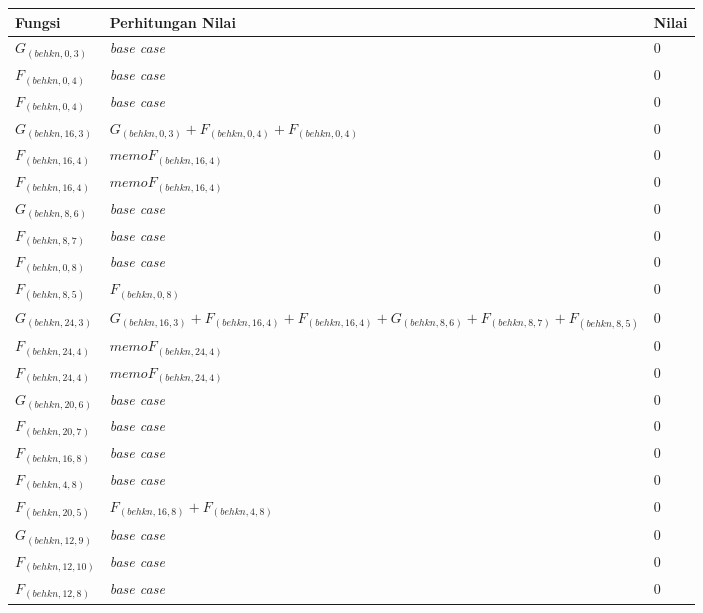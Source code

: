 \begin{appendices}
  \begin{table}[H]
  	\centering
  	\begin{tabular} {|p{3cm}|p{5cm}|p{1cm}|} \hline
  		Fungsi & Perhitungan Nilai & Nilai \\ \hline
  		$ G_{(behkn, 0, 3)} $ & \textit{base case} & $ 0 $ \\ \hline
  		$ F_{(behkn, 0, 4)} $ & \textit{base case} & $ 0 $ \\ \hline
  		$ F_{(behkn, 0, 4)} $ & \textit{base case} & $ 0 $ \\ \hline
  		$ G_{(behkn, 16, 3)}  $ & $G_{(behkn, 0, 3)} + F_{(behkn, 0, 4)} + F_{(behkn, 0, 4)}$ & $ 0 $ \\ \hline
  		$ F_{(behkn, 16, 4)}  $ & $memoF_{(behkn, 16, 4)}$ & $ 0 $ \\ \hline
  		$ F_{(behkn, 16, 4)}  $ & $memoF_{(behkn, 16, 4)}$ & $ 0 $ \\ \hline
  		$ G_{(behkn, 8, 6)} $ & \textit{base case} & $ 0 $ \\ \hline
  		$ F_{(behkn, 8, 7)} $ & \textit{base case} & $ 0 $ \\ \hline
  		$ F_{(behkn, 0, 8)} $ & \textit{base case} & $ 0 $ \\ \hline
  		$ F_{(behkn, 8, 5)}  $ & $F_{(behkn, 0, 8)}$ & $ 0 $ \\ \hline
  		$ G_{(behkn, 24, 3)}  $ & $G_{(behkn, 16, 3)} + F_{(behkn, 16, 4)} + F_{(behkn, 16, 4)} + G_{(behkn, 8, 6)} + F_{(behkn, 8, 7)} + F_{(behkn, 8, 5)}$ & $ 0 $ \\ \hline
  		$ F_{(behkn, 24, 4)}  $ & $memoF_{(behkn, 24, 4)}$ & $ 0 $ \\ \hline
  		$ F_{(behkn, 24, 4)}  $ & $memoF_{(behkn, 24, 4)}$ & $ 0 $ \\ \hline
  		$ G_{(behkn, 20, 6)} $ & \textit{base case} & $ 0 $ \\ \hline
  		$ F_{(behkn, 20, 7)} $ & \textit{base case} & $ 0 $ \\ \hline
  		$ F_{(behkn, 16, 8)} $ & \textit{base case} & $ 0 $ \\ \hline
  		$ F_{(behkn, 4, 8)} $ & \textit{base case} & $ 0 $ \\ \hline
  		$ F_{(behkn, 20, 5)}  $ & $F_{(behkn, 16, 8)} + F_{(behkn, 4, 8)}$ & $ 0 $ \\ \hline
  		$ G_{(behkn, 12, 9)} $ & \textit{base case} & $ 0 $ \\ \hline
  		$ F_{(behkn, 12, 10)} $ & \textit{base case} & $ 0 $ \\ \hline
  		$ F_{(behkn, 12, 8)} $ & \textit{base case} & $ 0 $ \\ \hline

\end{tabular}
\end{table}
\end{appendices}
